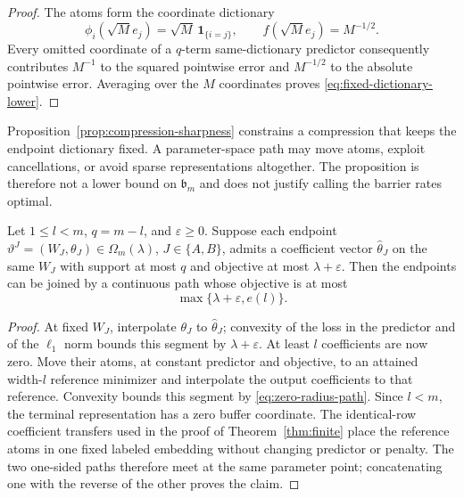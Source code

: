 \documentclass[smallextended,envcountsect]{svjour3}
\newcommand{\SubBar}{\mathfrak b}
\begin{document}
\begin{proof}
The atoms form the coordinate dictionary
\[
 \phi_i(\sqrt M e_j)=\sqrt M\,\mathbf 1_{\{i=j\}},
 \qquad f(\sqrt M e_j)=M^{-1/2}.
\]
Every omitted coordinate of a $q$-term
same-dictionary predictor consequently contributes $M^{-1}$ to the squared
pointwise error and $M^{-1/2}$ to the absolute pointwise error. Averaging over
the $M$ coordinates proves \eqref{eq:fixed-dictionary-lower}.
\end{proof}

\begin{remark}
Proposition~\ref{prop:compression-sharpness} constrains a compression that
keeps the endpoint dictionary fixed. A parameter-space path may move atoms,
exploit cancellations, or avoid sparse representations altogether. The
proposition is therefore not a lower bound on $\SubBar_m$ and does not justify
calling the barrier rates optimal.
\end{remark}

\begin{lemma}\label{lem:zero-radius-path}
Let $1\le l<m$, $q=m-l$, and $\varepsilon\ge0$.  Suppose each endpoint
$\vartheta^J=(W_J,\theta_J)\in\Omega_m(\lambda)$, $J\in\{A,B\}$, admits a
coefficient vector $\widehat\theta_J$ on the same $W_J$ with support at most
$q$ and objective at most $\lambda+\varepsilon$.  Then the endpoints can be
joined by a continuous path whose objective is at most
\begin{equation}
 \max\{\lambda+\varepsilon,e(l)\}.
 \label{eq:zero-radius-path}
\end{equation}
\end{lemma}

\begin{proof}
At fixed $W_J$, interpolate $\theta_J$ to $\widehat\theta_J$; convexity of the
loss in the predictor and of the $\ell_1$ norm bounds this segment by
$\lambda+\varepsilon$.  At least $l$ coefficients are now zero.  Move their
atoms, at constant predictor and objective, to an attained width-$l$ reference
minimizer and interpolate the output coefficients to that reference.
Convexity bounds this segment by \eqref{eq:zero-radius-path}.  Since $l<m$,
the terminal representation has a zero buffer coordinate.  The identical-row
coefficient transfers used in the proof of Theorem~\ref{thm:finite} place the
reference atoms in one fixed labeled embedding without changing predictor or
penalty.  The two one-sided paths therefore meet at the same parameter point;
concatenating one with the reverse of the other proves the claim.
\end{proof}
\end{document}
